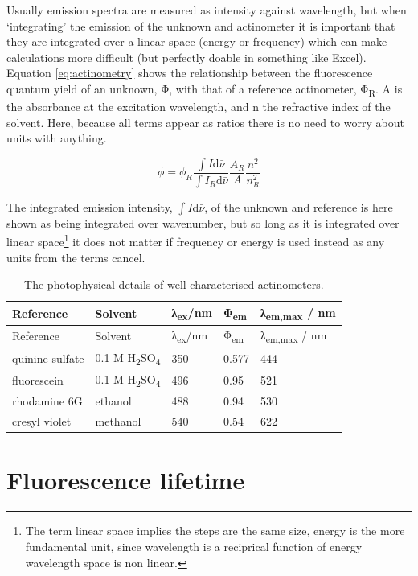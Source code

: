\documentclass[
]{book}
\begin{document}
Usually emission spectra are measured as intensity against wavelength, but when `integrating' the emission of the unknown and actinometer it is important that they are integrated over a linear space (energy or frequency) which can make calculations more difficult (but perfectly doable in something like Excel). Equation \eqref{eq:actinometry} shows the relationship between the fluorescence quantum yield of an unknown, Φ, with that of a reference actinometer, Φ\textsubscript{R}. A is the absorbance at the excitation wavelength, and n the refractive index of the solvent. Here, because all terms appear as ratios there is no need to worry about units with anything.

\begin{equation}
\phi=\phi_R \frac{\int{I}\textrm{d}\bar \nu}{\int{I_R}\textrm{d}\bar \nu}\frac{A_R}{A}\frac{n^2}{n^2_R}
\label{eq:actinometry}
\end{equation}

The integrated emission intensity, \(\int{I}\textrm{d}\bar \nu\), of the unknown and reference is here shown as being integrated over wavenumber, but so long as it is integrated over linear space\footnote{The term linear space implies the steps are the same size, energy is the more fundamental unit, since wavelength is a reciprical function of energy wavelength space is non linear.} it does not matter if frequency or energy is used instead as any units from the terms cancel.

\begin{longtable}[]{@{}lllll@{}}
\caption{\label{tab:actinometer} The photophysical details of well characterised actinometers.}\tabularnewline
\toprule
Reference & Solvent & λ\textsubscript{ex}/nm & Φ\textsubscript{em} & λ\textsubscript{em,max} / nm \\
\midrule
\endfirsthead
\toprule
Reference & Solvent & λ\textsubscript{ex}/nm & Φ\textsubscript{em} & λ\textsubscript{em,max} / nm \\
\midrule
\endhead
quinine sulfate & 0.1 M H\textsubscript{2}SO\textsubscript{4} & 350 & 0.577 & 444 \\
fluorescein & 0.1 M H\textsubscript{2}SO\textsubscript{4} & 496 & 0.95 & 521 \\
rhodamine 6G & ethanol & 488 & 0.94 & 530 \\
cresyl violet & methanol & 540 & 0.54 & 622 \\
\bottomrule
\end{longtable}

\hypertarget{fluorescence-lifetime}{%
\section{Fluorescence lifetime}\label{fluorescence-lifetime}}
\end{document}
